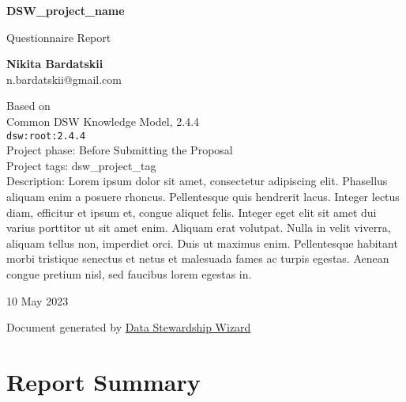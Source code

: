 \documentclass[a4paper,12pt]{report}
\begin{document}
\begin{titlepage}
    \begin{center}
        \vspace*{1cm}

        \Huge
        \textbf{DSW_project_name}

        \vspace{0.5cm}
        \LARGE
        Questionnaire Report

        \vspace{1.5cm}
        \Large
        \textbf{Nikita Bardatskii}\\
        n.bardatskii@gmail.com
        \vspace{1.5cm}

        \normalsize
        Based on\\
        Common DSW Knowledge Model, 2.4.4\\
        \texttt{dsw:root:2.4.4}\\
        \vspace{0.5cm}
        Project phase: Before Submitting the Proposal\\
        \vspace{0.25cm}
        Project tags: dsw_project_tag\\
        \vspace{0.25cm}
        Description: Lorem ipsum dolor sit amet, consectetur adipiscing elit. Phasellus aliquam enim a posuere rhoncus. Pellentesque quis hendrerit lacus. Integer lectus diam, efficitur et ipsum et, congue aliquet felis. Integer eget elit sit amet dui varius porttitor ut sit amet enim. Aliquam erat volutpat. Nulla in velit viverra, aliquam tellus non, imperdiet orci. Duis ut maximus enim. Pellentesque habitant morbi tristique senectus et netus et malesuada fames ac turpis egestas. Aenean congue pretium nisl, sed faucibus lorem egestas in.\\

        \vfill

        \Large
        {10 May 2023}

        \vspace{0.8cm}

        \normalsize
        Document generated by \href{https://ds-wizard.org}{Data Stewardship Wizard}
    \end{center}
\end{titlepage}

\chapter*{Report Summary}
\end{document}
